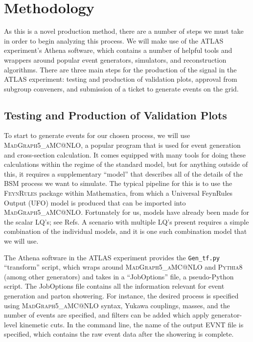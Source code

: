 \section{Methodology}\label{methodology}
    As this is a novel production method, there are a number of steps we must take in order to begin analyzing this process. We will make use of the ATLAS experiment's Athena software, which contains a number of helpful tools and wrappers around popular event generators, simulators, and reconstruction algorithms. There are three main steps for the production of the signal in the ATLAS experiment: testing and production of validation plots, approval from subgroup conveners, and submission of a ticket to generate events on the grid.

    \subsection{Testing and Production of Validation Plots}
        To start to generate events for our chosen process, we will use \textsc{MadGraph5\_aMC@NLO}, a popular program that is used for event generation and cross-section calculation. It comes equipped with many tools for doing these calculations within the regime of the standard model, but for anything outside of this, it requires a supplementary ``model'' that describes all of the details of the BSM process we want to simulate. The typical pipeline for this is to use the \textsc{FeynRules} package within Mathematica, from which a Universal FeynRules Output (UFO) model is produced that can be imported into \textsc{MadGraph5\_aMC@NLO}. Fortunately for us, models have already been made for the scalar LQ's; see Refs\cite{Dorsner_2018,Dorsner_2021}. A scenario with multiple LQ's present requires a simple combination of the individual models, and it is one such combination model that we will use.

        The Athena software in the ATLAS experiment provides the \texttt{Gen_tf.py} ``transform'' script, which wraps around \textsc{MadGraph5\_aMC@NLO} and \textsc{Pythia8} (among other generators) and takes in a ``JobOptions'' file, a pseudo-Python script. The JobOptions file contains all the information relevant for event generation and parton showering. For instance, the desired process is specified using \textsc{MadGraph5\_aMC@NLO} syntax, Yukawa couplings, masses, and the number of events are specified, and filters can be added which apply generator-level kinemetic cuts. In the command line, the name of the output EVNT file is specified, which contains the raw event data after the showering is complete.

